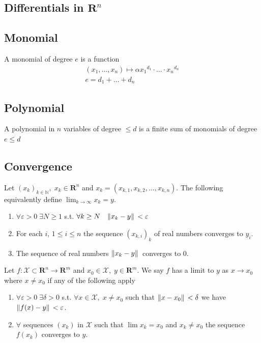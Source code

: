 \documentclass[8pt]{extarticle}
\newcommand{\R}{{\mathbb R}}
\newcommand{\X}{{\mathcal X}}
\newcommand{\ra}{{\rightarrow}}
\def\R{\mathbf{R}}
\begin{document}
\begin{multicols*}{3}
  \section{Differentials in $\R^n$}
  \hypertarget{sec:1}{}
  \subsection{Monomial}
  A monomial of degree $e$ is a function
  \begin{align*}
    (x_1, \dots, x_n) \mapsto \alpha {x_1}^{d_1} \cdot \ldots \cdot {x_n}^{d_n} \\
    e = d_1 + \ldots + d_n
  \end{align*}
  \subsection{Polynomial}
  A polynomial in $n$ variables of degree $\leq d$ is
  a finite sum of monomials of degree $e \leq d$
  \subsection{Convergence}
  Let $(x_k)_{k \in \mathbb{N}}, \; x_k \in \R^n$ and
  $x_k = (x_{k, 1}, x_{k, 2}, \dots, x_{k, n})$. The following
  equivalently define $\lim_{k \ra \infty} x_k = y$.
  \begin{enumerate}[label=(\arabic*)]
    \item $\forall \varepsilon > 0 \; \exists N \geq 1$ s.t.
          $\forall k \geq N \quad \norm*{x_k - y} < \varepsilon$
    \item For each $i$, $1 \leq i \leq n$ the sequence $(x_{k, i})_k$
          of real numbers converges to $y_i$.
    \item The sequence of real numbers $\norm*{x_k - y}$
          converges to $0$.
  \end{enumerate}
  Let $f: \X \subset \R^n \ra \R^m$
  and $x_0 \in \X, \; y \in \R^m$. We
  say $f$ has a limit to $y$ as $x \ra x_0$ where $x \neq x_0$
  if any of the following apply
  \begin{enumerate}[label=(\arabic*)]
    \item $\forall \varepsilon > 0 \; \exists \delta > 0$ s.t.
          $\forall x \in \X,\; x \neq x_0$ such that
          $\norm*{x - x_0} < \delta$ we have $\norm*{f(x) - y} < \varepsilon$.
    \item $\forall$ sequences $(x_k)$ in $\X$ such
          that $\lim x_k = x_0$ and $x_k \neq x_0$ the sequence
          $f(x_k)$ converges to $y$.
  \end{enumerate}

\end{multicols*}
\end{document}
